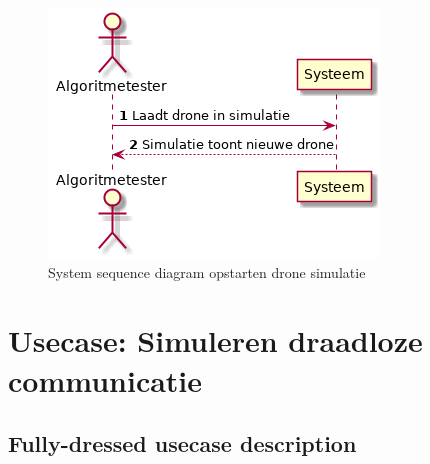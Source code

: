 \documentclass[a4paper, 11pt, oneside]{report}
\begin{document}
\begin{figure}[H]
	\begin{center}\includegraphics[height=.2\textheight]{UML/out/usecase/sequence/SimulerenDrone/SimulerenDrone.png}\end{center}
	\caption{System sequence diagram opstarten drone simulatie}
	\label{fig:simulatiedrone:systemsequence}
\end{figure}

\hypertarget{draadlozecom}{
\section[Simuleren draadloze communicatie]{Usecase: Simuleren draadloze communicatie}}
\label{Usecase:simmulatiecommuicatie}
\subsection{Fully-dressed usecase description}
\end{document}
